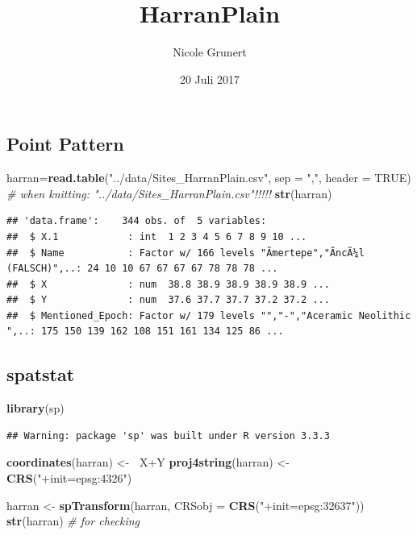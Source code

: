 \documentclass[]{article}
\title{HarranPlain}
\author{Nicole Grunert}
\date{20 Juli 2017}
\newenvironment{Shaded}{\begin{snugshade}}{\end{snugshade}}
\newcommand{\KeywordTok}[1]{\textcolor[rgb]{0.13,0.29,0.53}{\textbf{{#1}}}}
\newcommand{\DataTypeTok}[1]{\textcolor[rgb]{0.13,0.29,0.53}{{#1}}}
\newcommand{\StringTok}[1]{\textcolor[rgb]{0.31,0.60,0.02}{{#1}}}
\newcommand{\CommentTok}[1]{\textcolor[rgb]{0.56,0.35,0.01}{\textit{{#1}}}}
\newcommand{\OtherTok}[1]{\textcolor[rgb]{0.56,0.35,0.01}{{#1}}}
\newcommand{\ErrorTok}[1]{\textcolor[rgb]{0.64,0.00,0.00}{\textbf{{#1}}}}
\newcommand{\NormalTok}[1]{{#1}}
\begin{document}
\maketitle

{
\setcounter{tocdepth}{2}
\tableofcontents
}
\subsection{Point Pattern}\label{point-pattern}

\begin{Shaded}
\begin{Highlighting}[]
\NormalTok{harran=}\KeywordTok{read.table}\NormalTok{(}\StringTok{"../data/Sites_HarranPlain.csv"}\NormalTok{,}
                  \DataTypeTok{sep =} \StringTok{","}\NormalTok{,}
                  \DataTypeTok{header =} \OtherTok{TRUE}\NormalTok{) }\CommentTok{# when knitting: "../data/Sites_HarranPlain.csv"!!!!!}
\KeywordTok{str}\NormalTok{(harran)}
\end{Highlighting}
\end{Shaded}

\begin{verbatim}
## 'data.frame':    344 obs. of  5 variables:
##  $ X.1            : int  1 2 3 4 5 6 7 8 9 10 ...
##  $ Name           : Factor w/ 166 levels "Ãmertepe","ÃncÃ¼l (FALSCH)",..: 24 10 10 67 67 67 67 78 78 78 ...
##  $ X              : num  38.8 38.9 38.9 38.9 38.9 ...
##  $ Y              : num  37.6 37.7 37.7 37.2 37.2 ...
##  $ Mentioned_Epoch: Factor w/ 179 levels "","-","Aceramic Neolithic ",..: 175 150 139 162 108 151 161 134 125 86 ...
\end{verbatim}

\subsection{spatstat}\label{spatstat}

\begin{Shaded}
\begin{Highlighting}[]
\KeywordTok{library}\NormalTok{(sp)}
\end{Highlighting}
\end{Shaded}

\begin{verbatim}
## Warning: package 'sp' was built under R version 3.3.3
\end{verbatim}

\begin{Shaded}
\begin{Highlighting}[]
\KeywordTok{coordinates}\NormalTok{(harran) <-}\StringTok{ }\ErrorTok{~}\NormalTok{X+Y}
\KeywordTok{proj4string}\NormalTok{(harran) <-}\StringTok{ }\KeywordTok{CRS}\NormalTok{(}\StringTok{"+init=epsg:4326"}\NormalTok{)}

\NormalTok{harran <-}\StringTok{ }\KeywordTok{spTransform}\NormalTok{(harran, }\DataTypeTok{CRSobj =} \KeywordTok{CRS}\NormalTok{(}\StringTok{"+init=epsg:32637"}\NormalTok{))}
\KeywordTok{str}\NormalTok{(harran) }\CommentTok{# for checking}
\end{Highlighting}
\end{Shaded}
\end{document}
